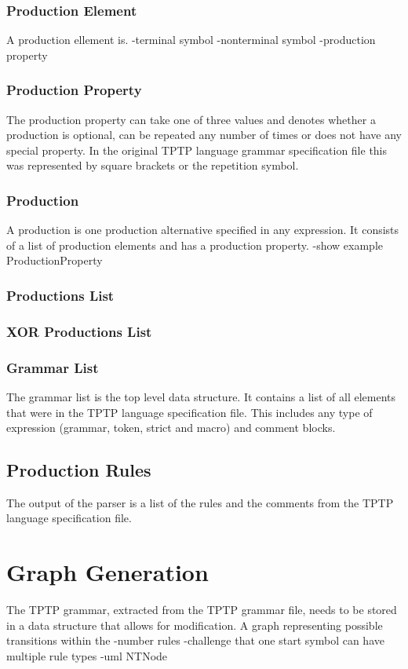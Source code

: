 \subsubsection{Production Element}
A production ellement is.
-terminal symbol
-nonterminal symbol
-production property
\subsubsection{Production Property}
The production property can take one of three values and denotes whether a production is optional, can be repeated any number of times or does not have any special property. In the original \ac{TPTP} language grammar specification file this was represented by square brackets or the repetition symbol.


\subsubsection{Production}
A production is one production alternative specified in any expression. It consists of a list of production elements and has a production property.
-show example
ProductionProperty
\subsubsection{Productions List}

\subsubsection{XOR Productions List}


\subsubsection{Grammar List}
The grammar list is the top level data structure. It contains a list of all elements that were in the \ac{TPTP} language specification file. This includes any type of expression (grammar, token, strict and macro) and comment blocks.

\subsection{Production Rules}


The output of the parser is a list of the rules and the comments from the \ac{TPTP} language specification file.
\section{Graph Generation}\label{sec:ConceptGraphGeneration}
The \ac{TPTP} grammar, extracted from the \ac{TPTP} grammar file, needs to be stored in a data structure that allows for modification.
A graph representing possible transitions within the 
-number rules
-challenge that one start symbol can have multiple rule types
-uml NTNode
